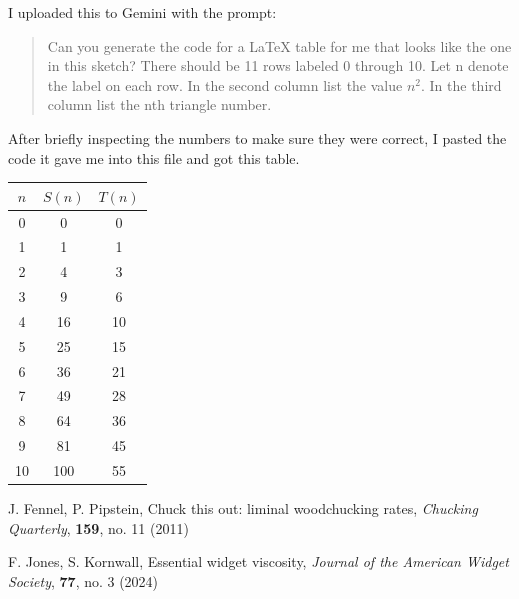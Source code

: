 \documentclass[11pt]{article}
\theoremstyle{definition}
\begin{document}
I uploaded this to Gemini with the prompt:
\begin{quote}
    Can you generate the code for a LaTeX table for me that looks like the one in this sketch? There should be 11 rows labeled 0 through 10. Let n denote the label on each row. In the second column list the value $n^2$. In the third column list the nth triangle number.
\end{quote}

After briefly inspecting the numbers to make sure they were correct, I pasted the code it gave me into this file and got this table.

\begin{center}
    \begin{tabular}{|c|c|c|}
        \hline
        $n$ & $S(n)$ & $T(n)$ \\
        \hline
        0 & 0 & 0 \\
        \hline
        1 & 1 & 1 \\
        \hline
        2 & 4 & 3 \\
        \hline
        3 & 9 & 6 \\
        \hline
        4 & 16 & 10 \\
        \hline
        5 & 25 & 15 \\
        \hline
        6 & 36 & 21 \\
        \hline
        7 & 49 & 28 \\
        \hline
        8 & 64 & 36 \\
        \hline
        9 & 81 & 45 \\
        \hline
        10 & 100 & 55 \\
        \hline
    \end{tabular}
\end{center}

\begin{thebibliography}{FP11}
    J. Fennel, P. Pipstein, Chuck this out: liminal woodchucking rates, \emph{Chucking Quarterly}, \textbf{159}, no. 11 (2011)

    F. Jones, S. Kornwall, Essential widget viscosity, \emph{Journal of the American Widget Society}, \textbf{77}, no. 3 (2024) 
\end{thebibliography}
\end{document}

